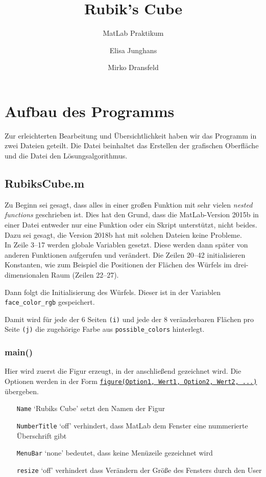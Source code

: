 \documentclass[a4paper,12pt]{scrreprt}
\title{Rubik's Cube}
\subtitle{MatLab Praktikum}
\author{Elisa Junghans\and Mirko Dransfeld}
\date{}
\newcommand{\codeimport}[4][]{
  
}
\newcommand{\codeinline}[1]{
  \lstinline!#1!
}
\newcommand{\chap}[2]{
  \chapter{#1}\label{chap:#2}
}
\renewcommand{\sec}[2]{
  \section{#1}\label{sec:#2}
}
\newcommand{\subsec}[2]{
  \subsection{#1}\label{subsec:#2}
}
\begin{document}
  \maketitle

  \chap{Aufbau des Programms}{aufbau}
    Zur erleichterten Bearbeitung und Übersichtlichkeit haben wir das Programm in zwei Dateien geteilt. Die Datei \textbf{} beinhaltet das Erstellen der grafischen Oberfläche und die Datei \textbf{} den Lösungsalgorithmus.

    \sec{RubiksCube.m}{RCube}
      Zu Beginn sei gesagt, dass alles in einer großen Funktion mit sehr vielen \emph{nested functions} geschrieben ist. Dies hat den Grund, dass die MatLab-Version 2015b in einer Datei entweder nur eine Funktion oder ein Skript unterstützt, nicht beides. Dazu sei gesagt, die Version 2018b hat mit solchen Dateien keine Probleme.\\

      In Zeile 3--17 werden globale Variablen gesetzt. Diese werden dann später von anderen Funktionen aufgerufen und verändert. Die Zeilen 20--42 initialisieren Konstanten, wie zum Beispiel die Positionen der Flächen des Würfels im drei-dimensionalen Raum (Zeilen 22--27).

      Dann folgt die Initialisierung des Würfels. Dieser ist in der Variablen \codeinline{face_color_rgb} gespeichert.
      \codeimport{44}{49}{RubiksCube}
      Damit wird für jede der 6 Seiten \codeinline{(i)} und jede der 8 veränderbaren Flächen pro Seite \codeinline{(j)} die zugehörige Farbe aus \codeinline{possible_colors} hinterlegt.

      \subsec{main()}{main}
        Hier wird zuerst die Figur erzeugt, in der anschließend gezeichnet wird. Die Optionen werden in der Form \hyperref[sec:figure]{\codeinline{figure(Option1, Wert1, Option2, Wert2, ...)}} übergeben.
        \codeimport{53}{53}{RubiksCube}
        \begin{itemize}
          \item[\texttt{Name}] `Rubiks Cube' setzt den Namen der Figur
          \item[\texttt{NumberTitle}] `off' verhindert, dass MatLab dem Fenster eine nummerierte Überschrift gibt
          \item[\texttt{MenuBar}] `none' bedeutet, dass keine Menüzeile gezeichnet wird
          \item[\texttt{resize}] `off' verhindert dass Verändern der Größe des Fensters durch den User
        \end{itemize}
\end{document}
